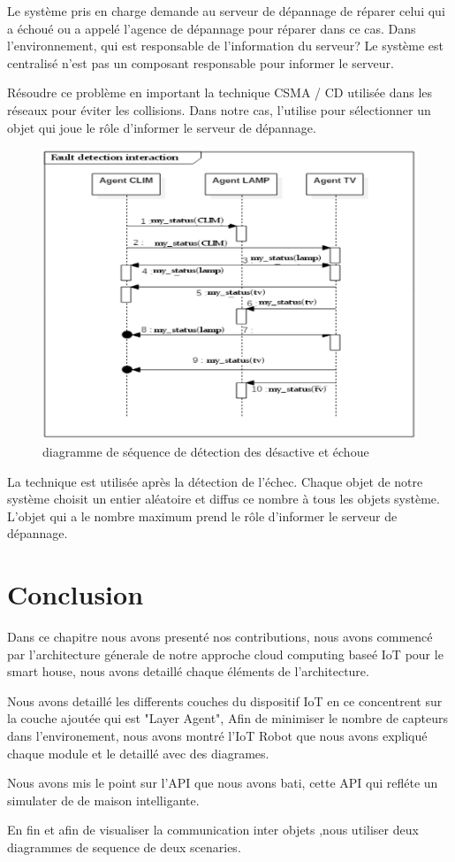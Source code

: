 Le système pris en charge demande au serveur de dépannage de réparer celui qui a échoué ou a appelé l’agence de dépannage pour réparer dans ce cas. Dans l'environnement, qui est responsable de l'information du serveur? Le système est centralisé n'est pas un composant responsable pour informer le serveur.


Résoudre ce problème en important la technique CSMA / CD \cite{6} utilisée dans les réseaux pour éviter les collisions. Dans notre cas, l’utilise pour sélectionner un objet qui joue le rôle d’informer le serveur de dépannage.

\begin{figure}[H]
\centering
\includegraphics[scale=0.9]{chap1/fc18.png}
\caption{diagramme de séquence de détection des désactive et échoue}
\label{fc18}
\end{figure}

La technique est utilisée après la détection de l'échec. Chaque objet de notre système choisit un entier aléatoire et diffus ce nombre à tous les objets système. L'objet qui a le nombre maximum prend le rôle d'informer le serveur de dépannage.
\section{Conclusion}


Dans ce chapitre nous avons presenté nos contributions, nous avons commencé par l'architecture génerale de notre approche cloud computing baseé IoT pour le smart house, nous avons detaillé chaque éléments de l'architecture.

Nous avons detaillé les differents couches du dispositif IoT en ce concentrent sur la couche ajoutée qui est "Layer Agent",
Afin de minimiser le nombre de capteurs dans l'environement, nous avons montré l'IoT Robot que nous avons expliqué chaque module et le detaillé avec des diagrames.

Nous avons mis le point sur l'API que nous avons bati, cette API qui refléte un simulater de de maison intelligante.


En fin et afin de visualiser la communication inter objets ,nous utiliser deux diagrammes de sequence de deux scenaries.





